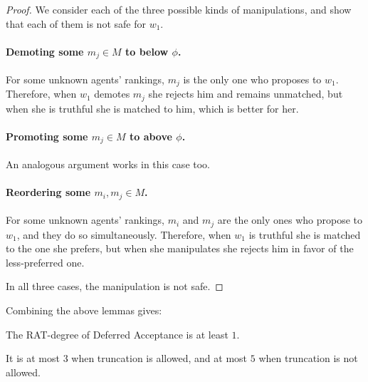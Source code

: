\begin{lemmarep}
\end{lemmarep}
\begin{proof}
We consider each of the three possible kinds of manipulations, and show that each of them is not safe for $w_1$.

\paragraph{Demoting some $m_j\in M$ to below $\phi$.}
For some unknown agents' rankings, $m_j$ is the only one who proposes to $w_1$.
Therefore, when $w_1$ demotes $m_j$ she rejects him and remains unmatched, but when she is truthful she is matched to him, which is better for her.

\paragraph{Promoting some $m_j\in M$ to above $\phi$.}
An analogous argument works in this case too.

\paragraph{Reordering some $m_i,m_j\in M$.}
For some unknown agents' rankings, $m_i$ and $m_j$ are the only ones who propose to $w_1$, and they do so simultaneously. Therefore, when $w_1$ is truthful she is matched to the one she prefers, but when she manipulates she rejects him in favor of the less-preferred one.

In all three cases, the manipulation is not safe.
\end{proof}

Combining the above lemmas gives:

\begin{theorem}
\label{prop-def-acc-trunc} 
\label{prop-def-acc-no-trunc}
The RAT-degree of Deferred Acceptance is at least $1$.

It is at most $3$ when truncation is allowed, 
and at most $5$ when truncation is not allowed.
\end{theorem}
 

